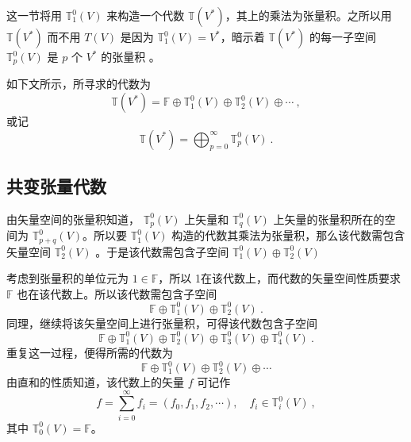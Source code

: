 
\begin{issues}
\end{issues}


这一节将用 $\mathbb T_1^0(V)$ 来构造一个代数 $\mathbb T(V^*)$，其上的乘法为张量积。之所以用 $\mathbb T(V^*)$ 而不用 $T(V)$ 是因为 $\mathbb T_1^0(V)=V^*$，暗示着 $\mathbb T(V^*)$ 的每一子空间 $\mathbb T_p^0(V)$ 是 $p$ 个 $V^*$ 的张量积 。 

如下文所示，所寻求的代数为
\begin{equation}
\mathbb T(V^*)=\mathbb F\oplus\mathbb T_1^0(V)\oplus\mathbb T_2^0(V)\oplus\cdots~,
\end{equation}
或记
\begin{equation}
\mathbb T(V^*)=\bigoplus_{p=0}^\infty\mathbb T_p^0(V)~.
\end{equation}
\subsection{共变张量代数}
由矢量空间的张量积知道， $\mathbb T_p^0(V)$ 上矢量和 $\mathbb T_q^0(V)$ 上矢量的张量积所在的空间为  $\mathbb T_{p+q}^0(V)$。所以要 $\mathbb T_1^0(V)$ 构造的代数其乘法为张量积，那么该代数需包含矢量空间 $\mathbb T_2^0(V)$ 。于是该代数需包含子空间 $\mathbb T_1^0(V)\oplus\mathbb T_2^0(V) $

 考虑到张量积的单位元为 $1\in\mathbb F$，所以 1在该代数上，而代数的矢量空间性质要求 $\mathbb F$ 也在该代数上。所以该代数需包含子空间
\begin{equation}
\mathbb F\oplus\mathbb T_1^0(V)\oplus\mathbb T_2^0(V) ~.
\end{equation} 
同理，继续将该矢量空间上进行张量积，可得该代数包含子空间
\begin{equation}
\mathbb F\oplus\mathbb T_1^0(V)\oplus\mathbb T_2^0(V)\oplus\mathbb T_3^0(V)\oplus\mathbb T_4^0(V)~.
\end{equation}
重复这一过程，便得所需的代数为
\begin{equation}
\mathbb F\oplus\mathbb T_1^0(V)\oplus\mathbb T_2^0(V)\oplus\cdots
\end{equation}
由直和的性质知道，该代数上的矢量 $f$ 可记作
\begin{equation}\label{eq_TenAlg_5}
f=\sum_{i=0}^\infty f_i=(f_0,f_1,f_2,\cdots),\quad f_i\in\mathbb T_i^0(V)~,
\end{equation}
其中 $\mathbb T_0^0(V)=\mathbb F$。

